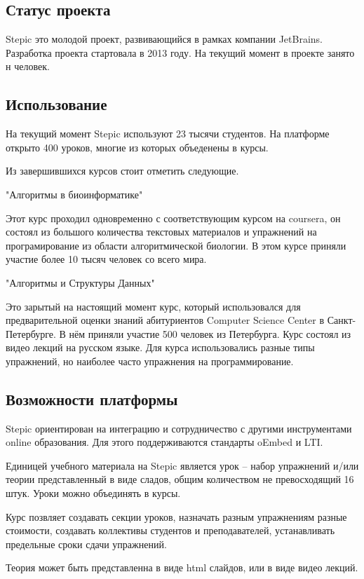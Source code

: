 \documentclass{matmex-diploma-custom}
\begin{document}
\subsection*{Статус проекта}
Stepic это молодой проект, развивающийся в рамках компании
JetBrains. Разработка проекта стартовала в 2013 году. На текущий
момент в проекте занято н человек. 

\subsection*{Использование}
На текущий момент Stepic используют 23 тысячи студентов. На платформе
открыто 400 уроков, многие из которых объеденены в курсы. 

Из завершившихся курсов стоит отметить следующие.

"Алгоритмы в биоинформатике" 

Этот курс проходил одновременно с соответствующим курсом на coursera,
он состоял из большого количества текстовых материалов и упражнений на
програмирование из области алгоритмической биологии. В этом курсе
приняли участие более 10 тысяч человек со всего мира.

"Алгоритмы и Структуры Данных"

Это зарытый на настоящий момент курс, который использовался для
предварительной оценки знаний абитуриентов Computer Science Center в
Санкт-Петербурге. В нём приняли участие 500 человек из
Петербурга. Курс состоял из видео лекций на русском языке. Для курса
использовались разные типы упражнений, но наиболее часто упражнения на
программирование.

\subsection*{Возможности платформы}
Stepic ориентирован на интеграцию и сотрудничество с другими инструментами
online образования. Для этого поддерживаются стандарты oEmbed и LTI.

Единицей учебного материала на Stepic является урок -- набор упражнений
и/или теории представленный в виде сладов, общим количеством не
превосходящий 16 штук. Уроки можно объединять в курсы.

Курс позвляет создавать секции уроков, назначать разным упражнениям
разные стоимости, создавать коллективы студентов и преподавателей,
устанавливать предельные сроки сдачи упражнений.

Теория может быть представленна в виде html слайдов, или в виде видео
лекций. 
\end{document}
